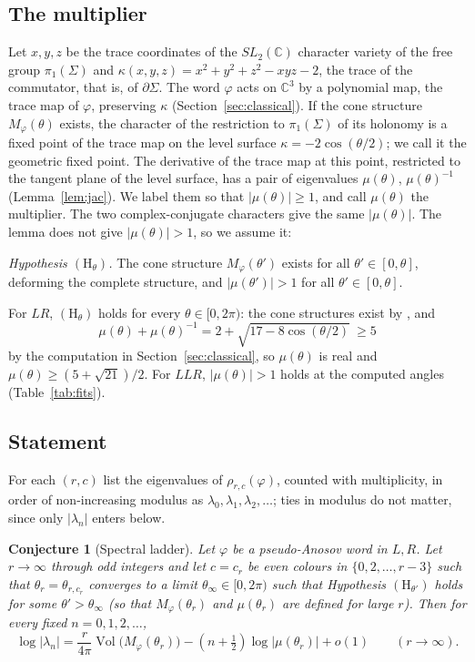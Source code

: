 \documentclass[11pt]{amsart}
\newtheorem{conjecture}{Conjecture}[section]
\theoremstyle{definition}
\theoremstyle{remark}
\newcommand{\Vol}{\operatorname{Vol}}
\newcommand{\C}{\mathbb{C}}
\begin{document}
\subsection{The multiplier}
Let $x, y, z$ be the trace coordinates of the $SL_2(\C)$ character variety of the
free group $\pi_1(\Sigma)$ and
$\kappa(x,y,z) = x^2 + y^2 + z^2 - xyz - 2$, the trace of the commutator, that is, of
$\partial\Sigma$. The word $\varphi$ acts on $\C^3$ by a polynomial map, the trace map
of $\varphi$, preserving $\kappa$ (Section~\ref{sec:classical}). If the cone structure
$M_\varphi(\theta)$ exists, the character of the restriction to $\pi_1(\Sigma)$ of its
holonomy is a fixed point of the trace map on the level surface
$\kappa = -2\cos(\theta/2)$; we call it the geometric fixed point. The derivative of
the trace map at this point, restricted to the tangent plane of the level surface, has
a pair of eigenvalues $\mu(\theta)$, $\mu(\theta)^{-1}$ (Lemma~\ref{lem:jac}). We
label them so that $|\mu(\theta)| \ge 1$, and call $\mu(\theta)$ the multiplier. The
two complex-conjugate characters give the same $|\mu(\theta)|$. The lemma does not
give $|\mu(\theta)| > 1$, so we assume it:

\smallskip
\noindent\emph{Hypothesis $(\mathrm{H}_\theta)$.} The cone structure
$M_\varphi(\theta')$ exists for all $\theta' \in [0, \theta]$, deforming the complete
structure, and $|\mu(\theta')| > 1$ for all $\theta' \in [0,\theta]$.
\smallskip

\noindent For $LR$, $(\mathrm{H}_\theta)$ holds for every $\theta \in [0, 2\pi)$:
the cone structures exist by \cite[Lemma~4.1]{PW}, and
\begin{equation}\label{eq:muLR}
\mu(\theta) + \mu(\theta)^{-1} = 2 + \sqrt{17 - 8\cos(\theta/2)} \ \ge 5
\end{equation}
by the computation in Section~\ref{sec:classical}, so $\mu(\theta)$ is real and
$\mu(\theta) \ge (5+\sqrt{21})/2$. For $LLR$, $|\mu(\theta)| > 1$ holds at the
computed angles (Table~\ref{tab:fits}).

\subsection{Statement}
For each $(r,c)$ list the eigenvalues of $\rho_{r,c}(\varphi)$, counted with
multiplicity, in order of non-increasing modulus as
$\lambda_0, \lambda_1, \lambda_2, \dots$; ties in modulus do not matter, since only
$|\lambda_n|$ enters below.

\begin{conjecture}[Spectral ladder]\label{conj:ladder}
Let $\varphi$ be a pseudo-Anosov word in $L, R$. Let $r \to \infty$ through odd
integers and let $c = c_r$ be even colours in $\{0, 2, \dots, r-3\}$ such that
$\theta_r = \theta_{r,c_r}$ converges to a limit $\theta_\infty \in [0, 2\pi)$ such
that Hypothesis $(\mathrm{H}_{\theta'})$ holds for some $\theta' > \theta_\infty$ (so
that $M_\varphi(\theta_r)$ and $\mu(\theta_r)$ are defined for large $r$). Then for
every fixed
$n = 0, 1, 2, \dots$,
\[
\log|\lambda_n| = \frac{r}{4\pi}\Vol\big(M_\varphi(\theta_r)\big)
- \left(n + \tfrac12\right)\log|\mu(\theta_r)| + o(1)
\qquad (r \to \infty).
\]
\end{conjecture}
\end{document}
